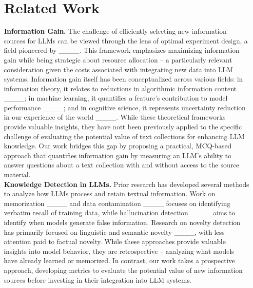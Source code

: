\section{Related Work}
\noindent\textbf{Information Gain. }
The challenge of efficiently selecting new information sources for LLMs can be viewed through the lens of optimal experiment design, a field pioneered by ____. This framework emphasizes maximizing information gain while being strategic about resource allocation -- a particularly relevant consideration given the costs associated with integrating new data into LLM systems. Information gain itself has been conceptualized across various fields: in information theory, it relates to reductions in algorithmic information content ____; in machine learning, it quantifies a feature's contribution to model performance ____; and in cognitive science, it represents uncertainty reduction in our experience of the world ____. While these theoretical frameworks provide valuable insights, they have nott been previously applied to the specific challenge of evaluating the potential value of text collections for enhancing LLM knowledge. Our work bridges this gap by proposing a practical, MCQ-based approach that quantifies information gain by measuring an LLM's ability to answer questions about a text collection with and without access to the source material.\\

\noindent\textbf{Knowledge Detection in LLMs. }
Prior research has developed several methods to analyze how LLMs process and retain textual information. Work on memorization ____ and data contamination ____ focuses on identifying verbatim recall of training data, while hallucination detection ____ aims to identify when models generate false information. Research on novelty detection has primarily focused on linguistic and semantic novelty ____, with less attention paid to factual novelty. While these approaches provide valuable insights into model behavior, they are retrospective -- analyzing what models have already learned or memorized. In contrast, our work takes a prospective approach, developing metrics to evaluate the potential value of new information sources before investing in their integration into LLM systems.